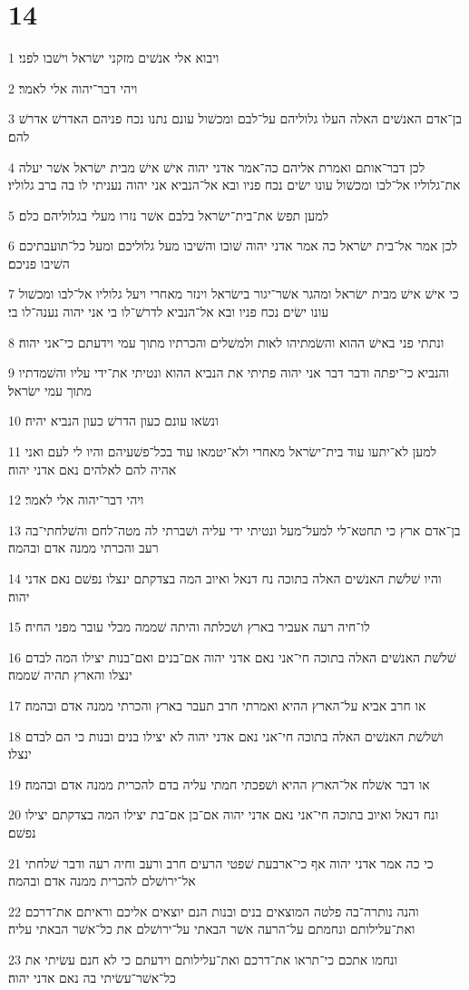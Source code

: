 \chapter{14}

\par 1 ויבוא אלי אנשׁים מזקני ישׂראל וישׁבו לפני׃
\par 2 ויהי דבר־יהוה אלי לאמר׃
\par 3 בן־אדם האנשׁים האלה העלו גלוליהם על־לבם ומכשׁול עונם נתנו נכח פניהם האדרשׁ אדרשׁ להם׃
\par 4 לכן דבר־אותם ואמרת אליהם כה־אמר אדני יהוה אישׁ אישׁ מבית ישׂראל אשׁר יעלה את־גלוליו אל־לבו ומכשׁול עונו ישׂים נכח פניו ובא אל־הנביא אני יהוה נעניתי לו בה ברב גלוליו׃
\par 5 למען תפשׂ את־בית־ישׂראל בלבם אשׁר נזרו מעלי בגלוליהם כלם׃
\par 6 לכן אמר אל־בית ישׂראל כה אמר אדני יהוה שׁובו והשׁיבו מעל גלוליכם ומעל כל־תועבתיכם השׁיבו פניכם׃
\par 7 כי אישׁ אישׁ מבית ישׂראל ומהגר אשׁר־יגור בישׂראל וינזר מאחרי ויעל גלוליו אל־לבו ומכשׁול עונו ישׂים נכח פניו ובא אל־הנביא לדרשׁ־לו בי אני יהוה נענה־לו בי׃
\par 8 ונתתי פני באישׁ ההוא והשׂמתיהו לאות ולמשׁלים והכרתיו מתוך עמי וידעתם כי־אני יהוה׃
\par 9 והנביא כי־יפתה ודבר דבר אני יהוה פתיתי את הנביא ההוא ונטיתי את־ידי עליו והשׁמדתיו מתוך עמי ישׂראל׃
\par 10 ונשׂאו עונם כעון הדרשׁ כעון הנביא יהיה׃
\par 11 למען לא־יתעו עוד בית־ישׂראל מאחרי ולא־יטמאו עוד בכל־פשׁעיהם והיו לי לעם ואני אהיה להם לאלהים נאם אדני יהוה׃
\par 12 ויהי דבר־יהוה אלי לאמר׃
\par 13 בן־אדם ארץ כי תחטא־לי למעל־מעל ונטיתי ידי עליה ושׁברתי לה מטה־לחם והשׁלחתי־בה רעב והכרתי ממנה אדם ובהמה׃
\par 14 והיו שׁלשׁת האנשׁים האלה בתוכה נח דנאל ואיוב המה בצדקתם ינצלו נפשׁם נאם אדני יהוה׃
\par 15 לו־חיה רעה אעביר בארץ ושׁכלתה והיתה שׁממה מבלי עובר מפני החיה׃
\par 16 שׁלשׁת האנשׁים האלה בתוכה חי־אני נאם אדני יהוה אם־בנים ואם־בנות יצילו המה לבדם ינצלו והארץ תהיה שׁממה׃
\par 17 או חרב אביא על־הארץ ההיא ואמרתי חרב תעבר בארץ והכרתי ממנה אדם ובהמה׃
\par 18 ושׁלשׁת האנשׁים האלה בתוכה חי־אני נאם אדני יהוה לא יצילו בנים ובנות כי הם לבדם ינצלו׃
\par 19 או דבר אשׁלח אל־הארץ ההיא ושׁפכתי חמתי עליה בדם להכרית ממנה אדם ובהמה׃
\par 20 ונח דנאל ואיוב בתוכה חי־אני נאם אדני יהוה אם־בן אם־בת יצילו המה בצדקתם יצילו נפשׁם׃
\par 21 כי כה אמר אדני יהוה אף כי־ארבעת שׁפטי הרעים חרב ורעב וחיה רעה ודבר שׁלחתי אל־ירושׁלם להכרית ממנה אדם ובהמה׃
\par 22 והנה נותרה־בה פלטה המוצאים בנים ובנות הנם יוצאים אליכם וראיתם את־דרכם ואת־עלילותם ונחמתם על־הרעה אשׁר הבאתי על־ירושׁלם את כל־אשׁר הבאתי עליה׃
\par 23 ונחמו אתכם כי־תראו את־דרכם ואת־עלילותם וידעתם כי לא חנם עשׂיתי את כל־אשׁר־עשׂיתי בה נאם אדני יהוה׃

